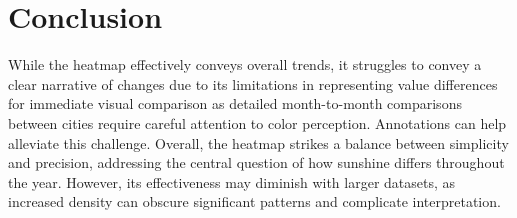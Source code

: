 \documentclass{article}
\begin{document}
\section{Conclusion}
                
While the heatmap effectively conveys overall trends, it struggles to convey a clear narrative of changes due to its limitations in representing value differences for immediate visual comparison as detailed month-to-month comparisons between cities require careful attention to color perception. Annotations can help alleviate this challenge. Overall, the heatmap strikes a balance between simplicity and precision, addressing the central question of how sunshine differs throughout the year. However, its effectiveness may diminish with larger datasets, as increased density can obscure significant patterns and complicate interpretation.\cite{heatmap}

\newpage

\begin{refcontext}[sorting=nyt]
\printbibliography
\end{refcontext}
\end{document}
